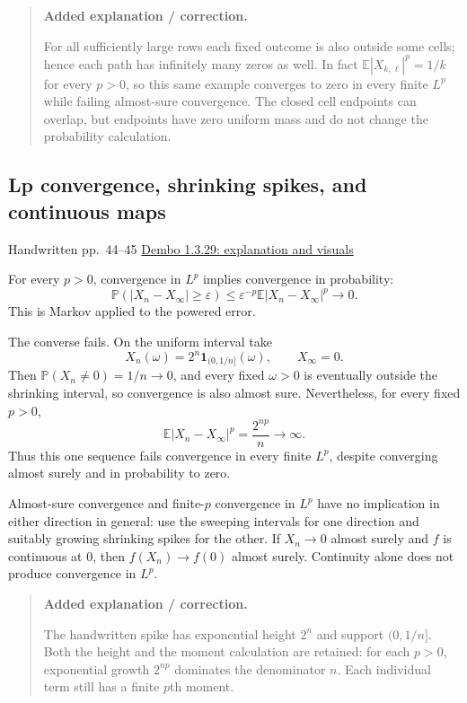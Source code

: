 \documentclass[11pt,letterpaper]{article}
\newcommand{\lecturesection}[1]{\subsection{#1}}
\begin{document}
\begin{quote}\small\textbf{Added explanation / correction.}

For all sufficiently large rows each fixed outcome is also outside some cells; hence each path has infinitely many zeros as well. In fact $\mathbb E|X_{k,\ell}|^p=1/k$ for every $p>0$, so this same example converges to zero in every finite $L^p$ while failing almost-sure convergence. The closed cell endpoints can overlap, but endpoints have zero uniform mass and do not change the probability calculation.
\end{quote}

\hypertarget{l5-s10}{}
\lecturesection{Lp convergence, shrinking spikes, and continuous maps}
{\small\textcolor{lectureink}{Handwritten pp.\ 44--45} \quad \href{https://josephrbailey.com/probability/\#entry-1-3-29}{Dembo 1.3.29: explanation and visuals}}

For every $p>0$, convergence in $L^p$ implies convergence in probability: \[\mathbb P(|X_n-X_\infty|\ge\varepsilon)\le\varepsilon^{-p}\mathbb E|X_n-X_\infty|^p\longrightarrow0.\] This is Markov applied to the powered error.

The converse fails. On the uniform interval take \[X_n(\omega)=2^n\mathbf1_{(0,1/n]}(\omega),\qquad X_\infty=0.\] Then $\mathbb P(X_n\ne0)=1/n\to0$, and every fixed $\omega>0$ is eventually outside the shrinking interval, so convergence is also almost sure. Nevertheless, for every fixed $p>0$, \[\mathbb E|X_n-X_\infty|^p=\frac{2^{np}}{n}\longrightarrow\infty.\] Thus this one sequence fails convergence in every finite $L^p$, despite converging almost surely and in probability to zero.

Almost-sure convergence and finite-$p$ convergence in $L^p$ have no implication in either direction in general: use the sweeping intervals for one direction and suitably growing shrinking spikes for the other. If $X_n\to0$ almost surely and $f$ is continuous at $0$, then $f(X_n)\to f(0)$ almost surely. Continuity alone does not produce convergence in $L^p$.

\begin{quote}\small\textbf{Added explanation / correction.}

The handwritten spike has exponential height $2^n$ and support $(0,1/n]$. Both the height and the moment calculation are retained: for each $p>0$, exponential growth $2^{np}$ dominates the denominator $n$. Each individual term still has a finite $p$th moment.
\end{quote}
\end{document}
